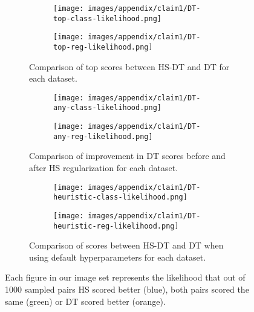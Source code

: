 \begin{figure}[hbt]
    \centering
    \begin{subfigure}[b]{\textwidth}
        \begin{subfigure}[b]{0.48\textwidth}
            \centering
            \texttt{[image: images/appendix/claim1/DT-top-class-likelihood.png]}
        \end{subfigure}
        \begin{subfigure}[b]{0.45\textwidth}
            \centering
            \texttt{[image: images/appendix/claim1/DT-top-reg-likelihood.png]}
        \end{subfigure}
        \caption{Comparison of top scores between HS-DT and DT for each dataset.}
        \label{fig:apendix-fig4-top}
    \end{subfigure}
    
    \begin{subfigure}[b]{\textwidth}
        \begin{subfigure}[b]{0.48\textwidth}
            \centering
            \texttt{[image: images/appendix/claim1/DT-any-class-likelihood.png]}
        \end{subfigure}
        \begin{subfigure}[b]{0.45\textwidth}
            \centering
            \texttt{[image: images/appendix/claim1/DT-any-reg-likelihood.png]}
        \end{subfigure}
        \caption{Comparison of improvement in DT scores before and after HS regularization for each dataset.}
        \label{fig:apendix-fig4-any}
    \end{subfigure}
    
    \begin{subfigure}[b]{\textwidth}
        \begin{subfigure}[b]{0.48\textwidth}
            \centering
            \texttt{[image: images/appendix/claim1/DT-heuristic-class-likelihood.png]}
        \end{subfigure}
        \begin{subfigure}[b]{0.45\textwidth}
            \centering
            \texttt{[image: images/appendix/claim1/DT-heuristic-reg-likelihood.png]}
        \end{subfigure}
        \label{fig:apendix-fig4-rf-improvement}
        \caption{Comparison of scores between HS-DT and DT when using default hyperparameters for each dataset.}
    \end{subfigure}
    \caption{Each figure in our image set represents the likelihood that out of 1000 sampled pairs HS scored better (blue), both pairs scored the same (green) or DT scored better (orange).}
\end{figure}

